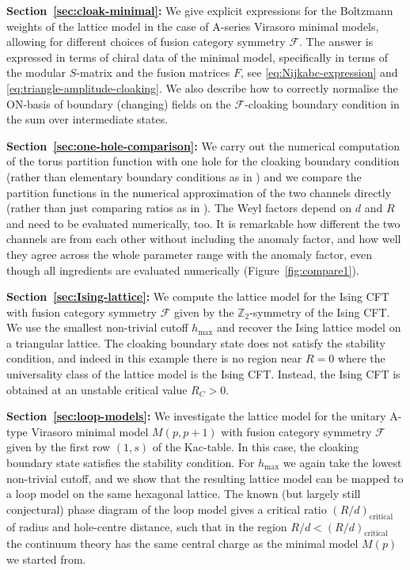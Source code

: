 \documentclass[11pt,a4paper]{article}
\numberwithin{equation}{section}
\begin{document}
\smallskip

\noindent
\textbf{Section~\ref{sec:cloak-minimal}:} We give explicit expressions for the Boltzmann weights of the lattice model in the case of A-series Virasoro minimal models, allowing for different choices of fusion category symmetry $\mathcal{F}$. The answer is expressed in terms of chiral data of the minimal model, specifically in terms of the modular $S$-matrix and the fusion matrices $F$, see \eqref{eq:Nijkabc-expression} and \eqref{eq:triangle-amplitude-cloaking}. We also describe how to correctly normalise the ON-basis of boundary (changing) fields on the $\mathcal{F}$-cloaking boundary condition in the sum over intermediate states.

\smallskip

\noindent
\textbf{Section~\ref{sec:one-hole-comparison}:}
We carry out the numerical computation of the torus partition function with one hole for the cloaking boundary condition (rather than elementary boundary conditions as in \cite{Brehm:2021wev}) and we compare the partition functions in the numerical approximation of the two channels directly (rather than just comparing ratios as in \cite{Brehm:2021wev}). 
The Weyl factors depend on $d$ and $R$ and need to be evaluated numerically, too. It is remarkable how different the two channels are from each other without including the anomaly factor, and how well they agree across the whole parameter range with the anomaly factor, even though all ingredients are evaluated numerically (Figure~\ref{fig:compare1}).

\smallskip

\noindent
\textbf{Section~\ref{sec:Ising-lattice}:} We compute the lattice model for the Ising CFT with fusion category symmetry $\mathcal{F}$ given by the $\mathbb{Z}_2$-symmetry of the Ising CFT. We use the smallest non-trivial cutoff $h_\text{max}$ and recover the Ising lattice model on a triangular lattice. The cloaking boundary state does not satisfy the stability condition, and indeed in this example there is no region near $R=0$ where the universality class of the lattice model is the Ising CFT. Instead, the Ising CFT is obtained at an unstable critical value $R_C>0$.

\smallskip

\noindent
\textbf{Section~\ref{sec:loop-models}:} We investigate the lattice model for the unitary A-type Virasoro minimal model $M(p,p+1)$ with fusion category symmetry $\mathcal{F}$ given by the first row $(1,s)$ of the Kac-table. In this case, the cloaking boundary state satisfies the stability condition.
For $h_\text{max}$ we again take the lowest non-trivial cutoff, and we show that the resulting lattice model can be mapped to a loop model on the same hexagonal lattice. The known (but largely still conjectural) phase diagram of the loop model gives a critical ratio $(R/d)_\text{critical}$ of radius and hole-centre distance, such that in the region $R/d < (R/d)_\text{critical}$ the continuum theory has the same central charge as the minimal model $M(p)$ we started from. 
\end{document}

